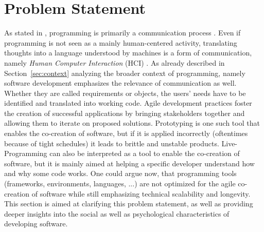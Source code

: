 

\section{Problem Statement}
As stated in , programming is primarily a communication process \cite{anonymous_what_1967}.
Even if programming is not seen as a mainly human-centered activity, translating thoughts into a language understood by machines is a form of communication, namely \emph{Human Computer Interaction} (HCI) \cite{myers_past_2009}.
As already described in Section~\ref{sec:context} analyzing the broader context of programming, namely software development emphasizes the relevance of communication as well.
Whether they are called requirements or objects, the users' needs have to be identified and translated into working code.
Agile development practices foster the creation of successful applications by bringing stakeholders together and allowing them to iterate on proposed solutions.
Prototyping is one such tool that enables the co-creation of software, but if it is applied incorrectly (oftentimes because of tight schedules) it leads to brittle and unstable products.
Live-Programming can also be interpreted as a tool to enable the co-creation of software, but it is mainly aimed at helping a specific developer understand how and why some code works.
One could argue now, that programming tools (frameworks, environments, languages, ...) are not optimized for the agile co-creation of software while still emphasizing technical scalability and longevity.
This section is aimed at clarifying this problem statement, as well as providing deeper insights into the social as well as psychological characteristics of developing software.


